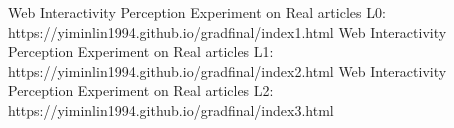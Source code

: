 \documentclass[9pt,journal,compsoc]{IEEEtran}
\begin{document}
\begin{thebibliography}{99}
 Web Interactivity Perception Experiment on Real articles L0: https://yiminlin1994.github.io/gradfinal/index1.html
 Web Interactivity Perception Experiment on Real articles L1: https://yiminlin1994.github.io/gradfinal/index2.html
 Web Interactivity Perception Experiment on Real articles L2: https://yiminlin1994.github.io/gradfinal/index3.html 


\end{thebibliography}
\end{document}
